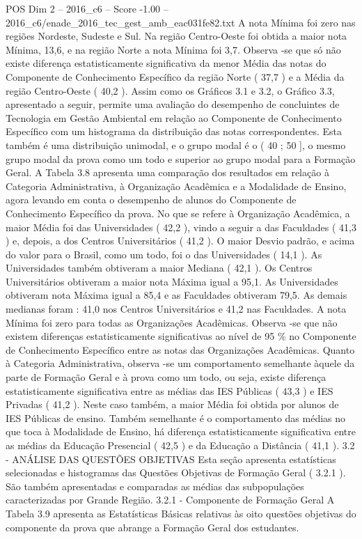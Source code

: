 \begin{textsample}{POS Dim 2 – 2016\_c6 – Score -1.00 – 2016\_c6/enade\_2016\_tec\_gest\_amb\_eac031fe82.txt}
A nota Mínima foi zero nas regiões Nordeste, Sudeste e Sul.
Na região Centro-Oeste foi obtida a maior nota Mínima, 13,6, e na região Norte a nota Mínima foi 3,7.
Observa -se que só não existe diferença estatisticamente significativa da menor Média das notas do Componente de Conhecimento Específico da região Norte ( 37,7 ) e a Média da região Centro-Oeste ( 40,2 ).
Assim como os Gráficos 3.1 e 3.2, o Gráfico 3.3, apresentado a seguir, permite uma avaliação do desempenho de concluintes de Tecnologia em Gestão Ambiental em relação ao Componente de Conhecimento Específico com um histograma da distribuição das notas correspondentes.
Esta também é uma distribuição unimodal, e o grupo modal é o ( 40 ; 50 ], o mesmo grupo modal da prova como um todo e superior ao grupo modal para a Formação Geral.
A Tabela 3.8 apresenta uma comparação dos resultados em relação à Categoria Administrativa, à Organização Acadêmica e a Modalidade de Ensino, agora levando em conta o desempenho de alunos do Componente de Conhecimento Específico da prova.
No que se refere à Organização Acadêmica, a maior Média foi das Universidades ( 42,2 ), vindo a seguir a das Faculdades ( 41,3 ) e, depois, a dos Centros Universitários ( 41,2 ).
O maior Desvio padrão, e acima do valor para o Brasil, como um todo, foi o das Universidades ( 14,1 ).
As Universidades também obtiveram a maior Mediana ( 42,1 ).
Os Centros Universitários obtiveram a maior nota Máxima igual a 95,1.
As Universidades obtiveram nota Máxima igual a 85,4 e as Faculdades obtiveram 79,5.
As demais medianas foram : 41,0 nos Centros Universitários e 41,2 nas Faculdades.
A nota Mínima foi zero para todas as Organizações Acadêmicas.
Observa -se que não existem diferenças estatisticamente significativas ao nível de 95 \% no Componente de Conhecimento Específico entre as notas das Organizações Acadêmicas.
Quanto à Categoria Administrativa, observa -se um comportamento semelhante àquele da parte de Formação Geral e à prova como um todo, ou seja, existe diferença estatisticamente significativa entre as médias das IES Públicas ( 43,3 ) e IES Privadas ( 41,2 ).
Neste caso também, a maior Média foi obtida por alunos de IES Públicas de ensino.
Também semelhante é o comportamento das médias no que toca à Modalidade de Ensino, há diferença estatisticamente significativa entre as médias da Educação Presencial ( 42,5 ) e da Educação a Distância ( 41,1 ). 3.2 - ANÁLISE DAS QUESTÕES OBJETIVAS Esta seção apresenta estatísticas selecionadas e histogramas das Questões Objetivas de Formação Geral ( 3.2.1 ).
São também apresentadas e comparadas as médias das subpopulações caracterizadas por Grande Região. 3.2.1 - Componente de Formação Geral A Tabela 3.9 apresenta as Estatísticas Básicas relativas às oito questões objetivas do componente da prova que abrange a Formação Geral dos estudantes.

\end{textsample}
